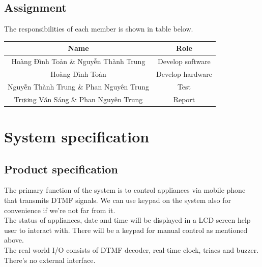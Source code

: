 \documentclass[a4paper]{article}
\begin{document}
\subsection{Assignment}
The responsibilities of each member is shown in table below.
\begin{table}[h!]
\centering
\begin{tabular}{||c | c ||}
\hline
Name               & Role             \\ \hline
Hoàng Đình Toản \& Nguyễn Thành Trung & Develop software \\ \hline
Hoàng Đình Toản    & Develop hardware \\ \hline
Nguyễn Thành Trung \& Phan Nguyên Trung  & Test             \\ \hline
Trương Văn Sáng \& Phan Nguyên Trung    & Report           \\ \hline
\end{tabular}
\end{table}

\newpage
\section{System specification}\label{fornul}

\subsection{Product specification}
The primary function of the system is to control appliances via mobile phone that transmits DTMF signals. We can use keypad on the system also for convenience if we're not far from it.\\
The status of appliances, date and time will be displayed in a LCD screen help user to interact with. There will be a keypad for manual control as mentioned above.\\
The real world I/O consists of DTMF decoder, real-time clock, triacs and buzzer. There's no external interface.
\end{document}
